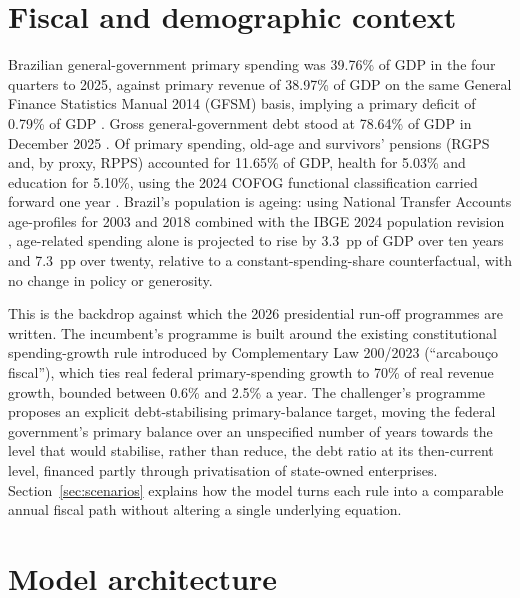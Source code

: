 \documentclass[11pt,a4paper]{article}
\begin{document}
\section{Fiscal and demographic context}
\label{sec:context}

Brazilian general-government primary spending was 39.76\% of GDP in the four quarters to 2025, against primary revenue of 38.97\% of GDP on the same General Finance Statistics Manual 2014 (GFSM) basis, implying a primary deficit of 0.79\% of GDP \citep{tesouro2025}. Gross general-government debt stood at 78.64\% of GDP in December 2025 \citep{bcbsgs}. Of primary spending, old-age and survivors' pensions (RGPS and, by proxy, RPPS) accounted for 11.65\% of GDP, health for 5.03\% and education for 5.10\%, using the 2024 COFOG functional classification carried forward one year \citep{tesourocofog2024}. Brazil's population is ageing: using National Transfer Accounts age-profiles for 2003 and 2018 \citep{nta2018} combined with the IBGE 2024 population revision \citep{ibge2024}, age-related spending alone is projected to rise by 3.3~pp of GDP over ten years and 7.3~pp over twenty, relative to a constant-spending-share counterfactual, with no change in policy or generosity.

This is the backdrop against which the 2026 presidential run-off programmes are written. The incumbent's programme is built around the existing constitutional spending-growth rule introduced by Complementary Law 200/2023 (``arcabou\c{c}o fiscal''), which ties real federal primary-spending growth to 70\% of real revenue growth, bounded between 0.6\% and 2.5\% a year. The challenger's programme proposes an explicit debt-stabilising primary-balance target, moving the federal government's primary balance over an unspecified number of years towards the level that would stabilise, rather than reduce, the debt ratio at its then-current level, financed partly through privatisation of state-owned enterprises. Section~\ref{sec:scenarios} explains how the model turns each rule into a comparable annual fiscal path without altering a single underlying equation.

\section{Model architecture}
\label{sec:architecture}
\end{document}
